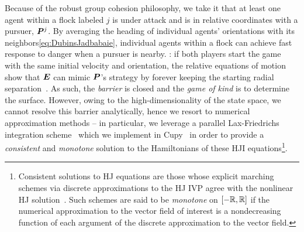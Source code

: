 Because of the robust group cohesion philosophy, we take it that at least one agent within a flock labeled $j$ is under attack and is in relative coordinates with a pursuer, $\bm{P}^j$. By averaging the heading of individual agents' orientations with its neighbors\cf \eqref{eq:DubinsJadbabaie}, individual agents within a flock can achieve  fast  response to danger when a pursuer is nearby. : if both players start the game with the same initial velocity and orientation, the relative equations of motion show that $\bm{E}$ can mimic $\bm{P}$'s strategy by forever keeping the starting radial separation~\cite{Merz1972}. As such, the \textit{barrier} is closed and the \textit{game of kind} is to determine the surface. However, owing to the high-dimensionality of the state space, we cannot resolve this barrier analytically, hence we resort to numerical approximation methods -- in particular, we leverage a parallel Lax-Friedrichs integration scheme~\cite{Crandall1984} which we implement in Cupy~\cite{CuPy} in order to provide a \textit{consistent} and \textit{monotone} solution to the Hamiltonians of these HJI equations\footnote{Consistent solutions to HJ equations are those whose explicit marching schemes via discrete  approximations to the HJ IVP agree with the nonlinear HJ solution~\cite{Crandall1984Approx}. Such schemes are said to be \textit{monotone} \eg on $\left[-\mathbb{R}, \mathbb{R}\right]$ if the numerical approximation to the vector field of interest is a nondecreasing function of each argument of the discrete approximation to the vector field.}. 
%

